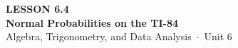 \documentclass[aspectratio=169, 11pt]{beamer}
\begin{document}
{
\begin{frame}[plain]
  \vspace{2.8cm}\hspace{0.55cm}%
  \begin{minipage}{0.9\textwidth}
    {\color{goldacc}\bfseries\small LESSON 6.4}\\[0.5cm]
    {\color{white}\bfseries\LARGE Normal Probabilities on the TI-84}\\[1.2cm]
    {\color{mistmid}\small Algebra, Trigonometry, and Data Analysis~$\cdot$~Unit 6}
  \end{minipage}
\end{frame}
}

\begin{frame}[t, plain]
\end{frame}
\end{document}
